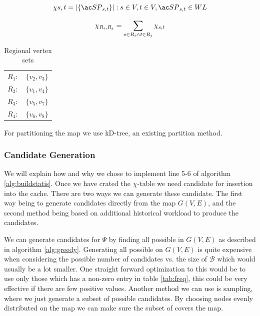 \begin{equation} \label{eq:chi}
\chi{s,t} = | \{\spath_{s,t}\} | : s \in V, t \in V, \spath_{s,t} \in WL
\end{equation}

\begin{equation} \label{eq:rchi}
\chi{\tiny _{R_i,R_j}} = \sum\limits_{s\in R_i \wedge t\in R_j} \chi_{s,t}
\end{equation}


\begin{table}
\center
\begin{tabular}{ll}
$R_1 :$ 	& $\{v_2,v_3\}$\\
$R_2 :$ 	& $\{v_1,v_4\}$ \\
$R_3 :$ 	& $\{v_5,v_7\}$ \\
$R_4 :$ 	& $\{v_6,v_8\}$ \\
\end{tabular}
\caption{Regional vertex sets}
\label{tab:vperregion}
\end{table}

For partitioning the map we use kD-tree, an existing partition method.




\subsubsection{Candidate Generation}

We will explain how and why we chose to implement line 5-6 of algorithm \ref{alg:buildstatis}. Once we have crated the $\chi$-table we need candidate \spaths for insertion into the cache. There are two ways we can generate these candidate. The first way being to generate candidates directly from the map $G(V,E)$, and the second method being based on additional historical workload to produce the candidates.

We can generate candidates for $\Psi$ by finding all possible \spath in $G(V,E)$ as described in algorithm \ref{alg:greedy}. Generating all \spath possible on $G(V,E)$ is quite expensive when considering the possible number of candidates vs. the size of $\mathcal{B}$ which would usually be a lot smaller. One straight forward optimization to this would be to use only those \spath which has a non-zero entry in table \ref{tab:freq}, this could be very effective if there are few positive values. Another method we can use is sampling, where we just generate a subset of possible candidates. By choosing nodes evenly distributed on the map we can make sure the subset of \spaths covers the map.

